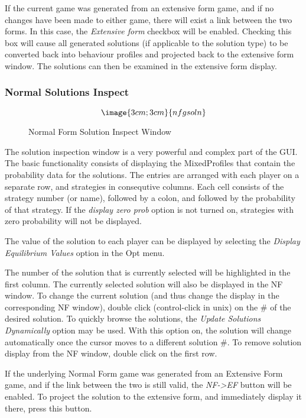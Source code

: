If the current game was generated from an extensive form game, and if no
changes have been made to either game, there will exist a link between the
two forms.  In this case, the {\em Extensive form} checkbox will be
enabled.  Checking this box will cause all generated solutions (if
applicable to the solution type) to be converted back into behaviour
profiles and projected back to the extensive form window.  The solutions
can then be examined in the extensive form display.


\subsubsection{Normal Solutions Inspect}\label{NormalSolutionInspect}
\begin{figure}
$$\image{3cm;3cm}{nfgsoln}$$
\caption{Normal Form Solution Inspect Window}\label{fig_nfgsoln}
\end{figure}


The solution inspection window is a very powerful and complex part of the GUI.
The basic functionality consists of displaying the MixedProfiles that contain the
probability data for the solutions.  The entries are arranged with each 
player on a separate row, and strategies in consequtive columns.  
Each cell consists of the strategy number (or name), followed by a colon, and followed
by the probability of that strategy.
If the {\em display zero prob} option is not turned on, strategies with zero probability
will not be displayed. 

The value of the solution to each player can be displayed by selecting the 
{\em Display Equilibrium Values} option in the Opt menu.

The number of the solution that is currently selected will be highlighted in the first
column.  The currently selected solution will also be displayed in the NF window.  
To change the current solution (and thus change the display in the 
corresponding NF window), double click (control-click in unix) on the \# of the
desired solution.  To quickly browse the solutions, the 
{\em Update Solutions Dynamically} 
option may be used.  With this option on, the solution will change automatically once
the cursor moves to a different solution \#.  To remove solution display from the NF window,
double click on the first row.

If the underlying Normal Form game was generated from an Extensive Form game, 
and if the link between the two is still 
valid, the {\em NF->EF} button will be enabled.  To project the solution to the 
extensive form, and immediately display it there, press this button.

